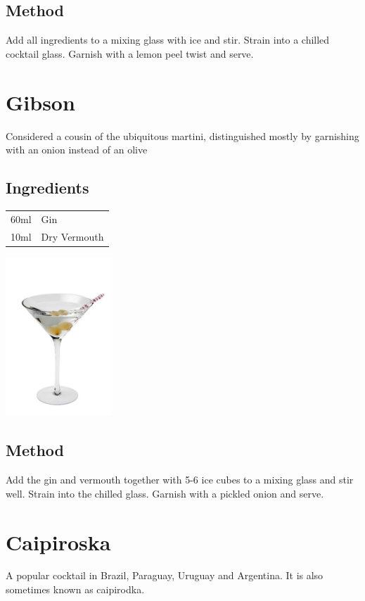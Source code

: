 \documentclass[12pt, letterpaper]{article}
\begin{document}
\subsection*{Method}
Add all ingredients to a mixing glass with ice and stir. Strain into a chilled cocktail glass. 
Garnish with a lemon peel twist and serve.

\pagebreak
\section{Gibson}
Considered a cousin of the ubiquitous martini,
distinguished mostly by garnishing with an onion instead of an olive

\subsection*{Ingredients}

\begin{multicols}{2}

\begin{tabular} { r | l}
    60ml & Gin \\
    10ml & Dry Vermouth \\
\end{tabular}

\includegraphics[height=6cm]{gibson}

\end{multicols}

\subsection*{Method}
Add the gin and vermouth together with 5-6 ice cubes to a mixing glass and stir well.
Strain into the chilled glass. Garnish with a pickled onion and serve.

\pagebreak
\section{Caipiroska}
A popular cocktail in Brazil, Paraguay, Uruguay and Argentina. It is also sometimes known as caipirodka.
\end{document}
